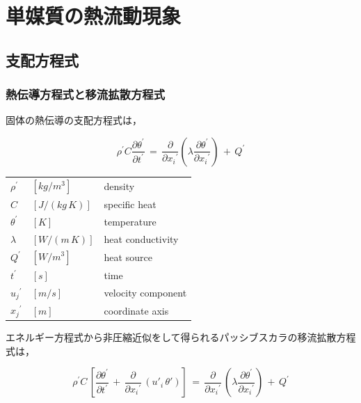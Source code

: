 \graphicspath{{./fig_MM/}}


%
\section{単媒質の熱流動現象}

%
\subsection{支配方程式}

%
\subsubsection{熱伝導方程式と移流拡散方程式}
固体の熱伝導の支配方程式\cite{shouji:95:Dennetsu}は，

\begin{equation}
\rho^{\prime} C \frac{\partial \theta^{\prime}}{\partial t^{\prime}}
\, =\,
\frac{\partial}{\partial {x_{i}}^{\prime}} \left({ \lambda \frac{\partial \theta^{\prime}}{\partial {x_{i}}^{\prime}} }\right)\,+\, Q^{\prime}
\label{eq:heat conduction eq}
\end{equation}

\begin{center}
\begin{tabular}{lll}
$\rho^{\prime}$ &  $[kg/m^3]$ & density \\
$C$ & $[J/(kg\,K)]$ & specific heat\\
$\theta^{\prime}$ & $[K]$ & temperature \\
$\lambda$ & $[W/(m\,K)]$ & heat conductivity \\
$Q^{\prime}$ & $[W/m^3]$ & heat source\\
$t^{\prime}$ & $[s]$ & time\\
${u_{j}}^{\prime}$ & $[m/s]$ & velocity component \\
${x_{j}}^{\prime}$ & $[m]$ & coordinate axis\\
\end{tabular}
\end{center}

エネルギー方程式から非圧縮近似をして得られるパッシブスカラの移流拡散方程式は，

\begin{equation}
\rho^{\prime} C \,\left[{ \frac{\partial \theta^{\prime}}{ \partial t^{\prime}} \,+\, \frac{\partial}{\partial {x_{i}}^{\prime}} \,\left({{{u}'}_{i}\,{\mathit{\theta}}'}\right)}\right]
\, =\,
\frac{\partial}{\partial {x_{i}}^{\prime}} \,\left({ \lambda \frac{ \partial \theta^{\prime}}{\partial{x_{i}}^{\prime}} }\right) \,+\, {Q}^{\prime}
\label{eq:passive scalar eq}
\end{equation}

